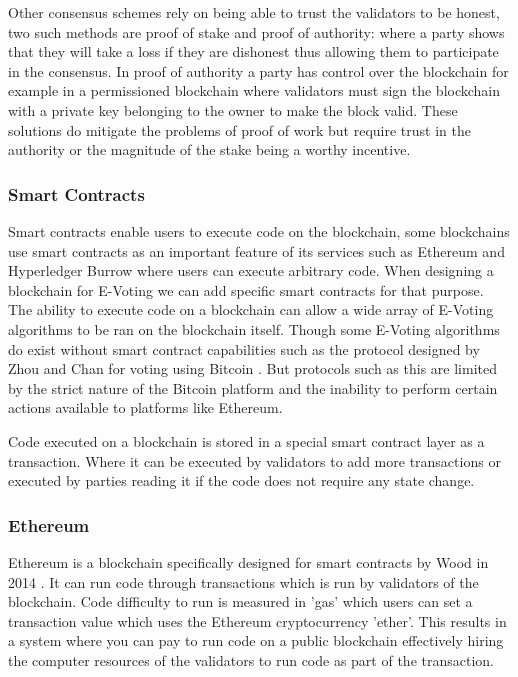 \documentclass{entcs}
\begin{document}
Other consensus schemes rely on being able to trust the validators to be honest, two such methods are proof of stake and proof of authority\cite{blockchainBeginners}\cite{baliga2017understanding}: where a party shows that they will take a loss if they are dishonest thus allowing them to participate in the consensus. In proof of authority a party has control over the blockchain for example in a permissioned blockchain where validators must sign the blockchain with a private key belonging to the owner to make the block valid. These solutions do mitigate the problems of proof of work but require trust in the authority or the magnitude of the stake being a worthy incentive.

\subsubsection{Smart Contracts}
Smart contracts enable users to execute code on the blockchain, some blockchains use smart contracts as an important feature of its services such as Ethereum \cite{wood2014ethereum} and Hyperledger Burrow \cite{HyperLedgerBurrow} where users can execute arbitrary code. When designing a blockchain for E-Voting we can add specific smart contracts for that purpose. The ability to execute code on a blockchain can allow a wide array of E-Voting algorithms to be ran on the blockchain itself. Though some E-Voting algorithms do exist without smart contract capabilities such as the protocol designed by Zhou and Chan for voting using Bitcoin \cite{zhao2015vote}. But protocols such as this are limited by the strict nature of the Bitcoin platform and the inability to perform certain actions available to platforms like Ethereum.

Code executed on a blockchain is stored in a special smart contract layer as a transaction. Where it can be executed by validators to add more transactions or executed by parties reading it if the code does not require any state change.

\subsubsection{Ethereum}
Ethereum is a blockchain specifically designed for smart contracts by Wood in 2014 \cite{wood2014ethereum}. It can run code through transactions which is run by validators of the blockchain. Code difficulty to run is measured in 'gas' which users can set a transaction value which uses the Ethereum cryptocurrency 'ether'. This results in a system where you can pay to run code on a public blockchain effectively hiring the computer resources of the validators to run code as part of the transaction.
\end{document}
